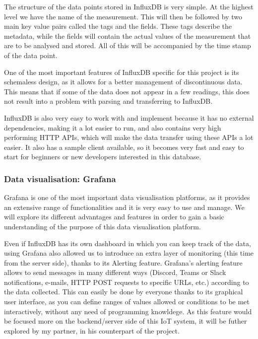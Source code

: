 \documentclass[12pt]{article}
\begin{document}
The structure of the data points stored in InfluxDB is very simple. At the highest level we have the name of the measurement. This will then be followed by two main key value pairs called the tags and the fields. These tags describe the metadata, while the fields will contain the actual values of the measurement that are to be analysed and stored. All of this will be accompanied by the time stamp of the data point. \par

One of the most important features of InfluxDB specific for this project is its schemaless design, as it allows for a better management of discontinuous data. This means that if some of the data does not appear in a few readings, this does not result into a problem with parsing and transferring to InfluxDB.\par 

InfluxDB is also very easy to work with and implement because it has no external dependencies, making it a lot easier to run, and also contains very high performing HTTP APIs, which will make the data transfer using these APIs a lot easier. It also has a sample client available, so it becomes very fast and easy to start for beginners or new developers interested in this database.

\subsubsection{Data visualisation: Grafana}

Grafana is one of the most important data visualisation platforms, as it provides an extensive range of functionalities and it is very easy to use and manage. We will explore its different advantages and features in order to gain a basic understanding of the purpose of this data visualisation platform.\par

Even if InfluxDB has its own dashboard in which you can keep track of the data, using Grafana also allowed us to introduce an extra layer of monitoring (this time from the server side), thanks to its Alerting feature. Grafana's alerting feature allows to send messages in many different ways (Discord, Teams or Slack notifications, e-mails, HTTP POST requests to specific URLs, etc.) according to the data collected. This can easily be done by everyone thanks to its graphical user interface, as you can define ranges of values allowed or conditions to be met interactively, without any need of programming knowldege. As this feature would be focused more on the backend/server side of this IoT system, it will be futher explored by my partner, in his counterpart of the project.
\end{document}
